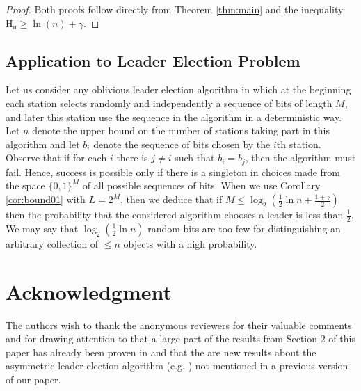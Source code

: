 \documentclass[proceedings]{dmtcs}
\newcommand{\HarmonicN}[1]{\mathrm{H_{#1}}}
\begin{document}
\begin{proof}
Both proofs follow directly from Theorem \ref{thm:main} and the inequality $\HarmonicN{n} \geq \ln(n) + \gamma$. 
\end{proof}

\subsection{Application to Leader Election Problem}

Let us consider any oblivious leader election algorithm in which at the beginning each station selects randomly and independently
a sequence of bits of length $M$, and later this station use the sequence 
in the algorithm in a deterministic way. 
Let $n$ denote the upper bound on the number of stations taking part in this algorithm 
and let $b_i$ denote the sequence of bits chosen by the $i$th station.
Observe that if for each $i$ there is $j\neq i$ such that $b_i = b_j$, then the algorithm must fail. 
Hence, success is possible only if there is a singleton  in choices made from the space $\{0,1\}^M$ 
of all possible sequences of bits. When we use Corollary \ref{cor:bound01} with $L = 2^M$, then we deduce
that if $M \leq \log_2\left(\frac12 \ln n + \frac{1+\gamma}{2}\right)$ then the probability that the considered algorithm
chooses a leader is less than  $\frac12$. We may say that $\log_2(\frac12 \ln n)$ random bits are too few for distinguishing 
an arbitrary collection of $\leq n$ objects with a high probability.  

\section*{Acknowledgment}
The authors wish to thank the anonymous reviewers for their valuable comments and for drawing attention to that a large part of the results from Section 2 of this paper has already been proven in \cite{kirschenhofer1996} and that the are new results about the asymmetric leader election algorithm (e.g. \cite{GLandHP2009}) not mentioned in a previous version of our paper.
 


\label{lastpage}
\end{document}

